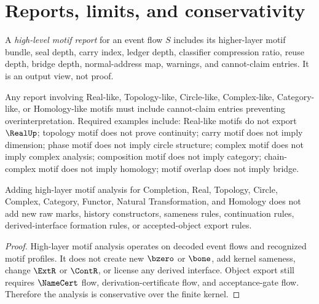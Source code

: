 \section{Reports, limits, and conservativity}
\label{sec:higher-case-reports-limits}

\begin{definition}
\label{def:higher-case-report}
A \emph{high-level motif report} for an event flow $S$ includes its higher-layer motif bundle, seal depth, carry index, ledger depth, classifier compression ratio, reuse depth, bridge depth, normal-address map, warnings, and cannot-claim entries. It is an output view, not proof.
\end{definition}

\begin{principle}
\label{prin:higher-case-reports-require-cannot-claims}
Any report involving Real-like, Topology-like, Circle-like, Complex-like, Category-like, or Homology-like motifs must include cannot-claim entries preventing overinterpretation. Required examples include: Real-like motifs do not export $\RealUp$; topology motif does not prove continuity; carry motif does not imply dimension; phase motif does not imply circle structure; complex motif does not imply complex analysis; composition motif does not imply category; chain-complex motif does not imply homology; motif overlap does not imply bridge.
\end{principle}

\begin{theorem}
\label{thm:higher-case-conservativity}
Adding high-layer motif analysis for Completion, Real, Topology, Circle, Complex, Category, Functor, Natural Transformation, and Homology does not add new raw marks, history constructors, sameness rules, continuation rules, derived-interface formation rules, or accepted-object export rules.
\end{theorem}

\begin{proof}
High-layer motif analysis operates on decoded event flows and recognized motif profiles. It does not create new $\bzero$ or $\bone$, add kernel sameness, change $\ExtR$ or $\ContR$, or license any derived interface. Object export still requires $\NameCert$ flow, derivation-certificate flow, and acceptance-gate flow. Therefore the analysis is conservative over the finite kernel.
\end{proof}

